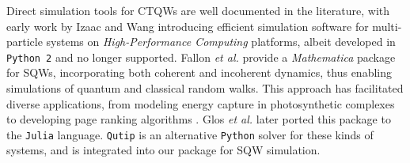\documentclass[main.tex]{subfiles}
\begin{document}


Direct simulation tools for CTQWs are well documented in the literature, with
early work by Izaac and Wang \cite{izaac2015} introducing efficient simulation
software for multi-particle systems on \textit{High-Performance Computing}
platforms, albeit developed in \texttt{Python 2} and no longer supported.
Fallon \textit{et al.} \cite{falloon2017a} provide a \textit{Mathematica}
package for SQWs, incorporating both coherent and incoherent dynamics, thus
enabling simulations of quantum and classical random walks. This approach has
facilitated diverse applications, from modeling energy capture in
photosynthetic complexes \cite{mohseni08} to developing page ranking algorithms
\cite{SanchezBurillo2012}. Glos \textit{et al.} \cite{glos2018}
later ported this package to the \texttt{Julia} language. \texttt{Qutip}
\cite{Johansson2011,Johansson2012} is an alternative \texttt{Python} solver for
these kinds of systems, and is integrated into our package for SQW simulation.
\end{document}
